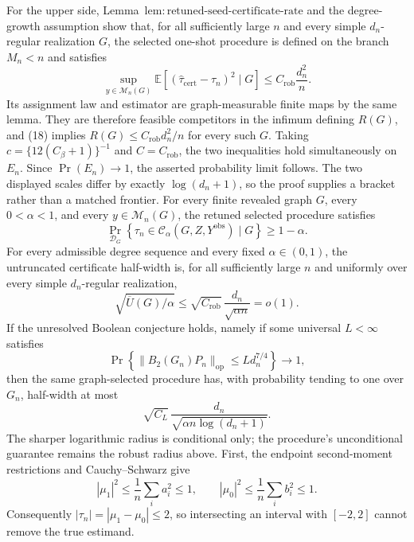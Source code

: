 For the upper side, Lemma~\(\mathrm{lem{:}retuned\mbox{-}seed\mbox{-}certificate\mbox{-}rate}\) and the degree-growth assumption show that, for all sufficiently large \(n\) and every simple \(d_n\)-regular realization \(G\), the selected one-shot procedure is defined on the branch \(M_n<n\) and satisfies
\[
\sup_{y\in\mathcal M_n(G)}
\mathbb E\!\left[(\widehat\tau_{\mathrm{cert}}-\tau_n)^2\mid G\right]
\le C_{\mathrm{rob}}\frac{d_n^2}{n}.
\tag{18}
\]
Its assignment law and estimator are graph-measurable finite maps by the same lemma.  They are therefore feasible competitors in the infimum defining \(R(G)\), and (18) implies \(R(G)\le C_{\mathrm{rob}}d_n^2/n\) for every such \(G\).  Taking
\(c=\{12(C_\beta+1)\}^{-1}\) and \(C=C_{\mathrm{rob}}\), the two inequalities hold simultaneously on \(E_n\).  Since \(\Pr(E_n)\to1\), the asserted probability limit follows.  The two displayed scales differ by exactly \(\log(d_n+1)\), so the proof supplies a bracket rather than a matched frontier.
For every finite revealed graph \(G\), every \(0<\alpha<1\), and every \(y\in\mathcal M_n(G)\), the retuned selected procedure satisfies
\[
\Pr_{\mathcal D_G}\!\left\{
\tau_n\in\mathcal C_\alpha(G,Z,Y^{\mathrm{obs}})\mid G
\right\}\ge1-\alpha.
\]
For every admissible degree sequence and every fixed \(\alpha\in(0,1)\), the untruncated certificate half-width is, for all sufficiently large \(n\) and uniformly over every simple \(d_n\)-regular realization,
\[
\sqrt{\overline U(G)/\alpha}
\le \sqrt{C_{\mathrm{rob}}}\,
\frac{d_n}{\sqrt{\alpha n}}=o(1).
\]
If the unresolved Boolean conjecture holds, namely if some universal \(L<\infty\) satisfies
\[
\Pr\!\left\{\|B_2(G_n)P_n\|_{\mathrm{op}}
\le Ld_n^{7/4}\right\}\longrightarrow1,
\]
then the same graph-selected procedure has, with probability tending to one over \(G_n\), half-width at most
\[
\sqrt{C_L}\,
\frac{d_n}{\sqrt{\alpha n\log(d_n+1)}}.
\]
The sharper logarithmic radius is conditional only; the procedure's unconditional guarantee remains the robust radius above.
First, the endpoint second-moment restrictions and Cauchy--Schwarz give
\[
|\mu_1|^2\le\frac1n\sum_i a_i^2\le1,
\qquad
|\mu_0|^2\le\frac1n\sum_i b_i^2\le1.
\]
Consequently \(|\tau_n|=|\mu_1-\mu_0|\le2\), so intersecting an interval with \([-2,2]\) cannot remove the true estimand.

